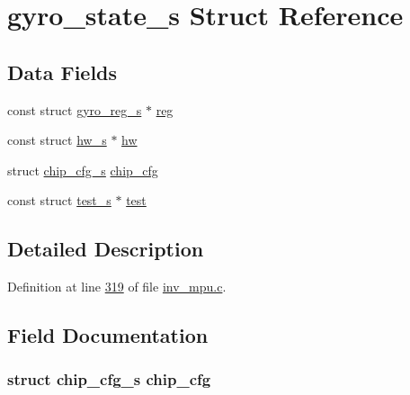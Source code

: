 \hypertarget{structgyro__state__s}{}\section{gyro\+\_\+state\+\_\+s Struct Reference}
\label{structgyro__state__s}
\subsection*{Data Fields}
\begin{DoxyCompactItemize}
\item 
const struct \hyperlink{structgyro__reg__s}{gyro\+\_\+reg\+\_\+s} $\ast$ \hyperlink{structgyro__state__s_ae857e1285c583b7438a208edd691a38e}{reg}
\item 
const struct \hyperlink{structhw__s}{hw\+\_\+s} $\ast$ \hyperlink{structgyro__state__s_a5bac30a96752691e4cc723735060e360}{hw}
\item 
struct \hyperlink{structchip__cfg__s}{chip\+\_\+cfg\+\_\+s} \hyperlink{structgyro__state__s_ac895217592e2084bd520b0be8e9d20ee}{chip\+\_\+cfg}
\item 
const struct \hyperlink{structtest__s}{test\+\_\+s} $\ast$ \hyperlink{structgyro__state__s_a4dc7fb069be996a5f40e25c01338a3ca}{test}
\end{DoxyCompactItemize}


\subsection{Detailed Description}


Definition at line \hyperlink{inv__mpu_8c_source_l00319}{319} of file \hyperlink{inv__mpu_8c_source}{inv\+\_\+mpu.\+c}.



\subsection{Field Documentation}
\subsubsection[{\texorpdfstring{chip\+\_\+cfg}{chip_cfg}}]{\setlength{\rightskip}{0pt plus 5cm}struct {\bf chip\+\_\+cfg\+\_\+s} chip\+\_\+cfg}\hypertarget{structgyro__state__s_ac895217592e2084bd520b0be8e9d20ee}{}\label{structgyro__state__s_ac895217592e2084bd520b0be8e9d20ee}


